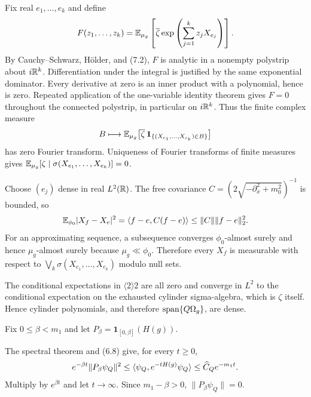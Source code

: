 \documentclass[11pt,a4paper]{article}
\begin{document}

\Because Fix real $e_1,\dots,e_k$ and define
\[
 F(z_1,\dots,z_k)=
 \mathbb E_{\mu_g}\left[\overline\zeta\exp\left(\sum_{j=1}^kz_jX_{e_j}\right)\right].
\]
By Cauchy--Schwarz, H\"older, and (7.2), $F$ is analytic in a nonempty
polystrip about $i\mathbb R^k$.  Differentiation under the integral is justified by the
same exponential dominator.  Every derivative at zero is an inner product with a
polynomial, hence is zero.  Repeated application of the one-variable identity theorem
gives $F=0$ throughout the connected polystrip, in particular on $i\mathbb R^k$.
Thus the finite complex measure
\[
 B\longmapsto\mathbb E_{\mu_g}\big[\overline\zeta\,
 \mathbf1_{\{(X_{e_1},\ldots,X_{e_k})\in B\}}\big]
\]
has zero Fourier transform.  Uniqueness of Fourier transforms of finite measures gives
$\mathbb E_{\mu_g}[\zeta\mid\sigma(X_{e_1},\dots,X_{e_k})]=0$.


\Because Choose $(e_j)$ dense in real $L^2(\mathbb R)$.  The free covariance
$C=(2\sqrt{-\partial_x^2+m_0^2})^{-1}$ is bounded, so
\[
 \mathbb E_{\phi_0}|X_f-X_e|^2=\langle f-e,C(f-e)\rangle\leq\|C\|\|f-e\|_2^2.
\]
For an approximating sequence, a subsequence converges $\phi_0$-almost surely and
hence $\mu_g$-almost surely because $\mu_g\ll\phi_0$.  Therefore every $X_f$ is
measurable with respect to $\bigvee_k\sigma(X_{e_1},\dots,X_{e_k})$ modulo null sets.


\Because The conditional expectations in $\langle2\rangle2$ are all zero and converge
in $L^2$ to the conditional expectation on the exhausted cylinder sigma-algebra, which
is $\zeta$ itself.  Hence cylinder polynomials, and therefore
$\operatorname{span}\{Q\Omega_g\}$, are dense.

\QedStep


Fix $0\leq\beta<m_1$ and let $P_\beta=\mathbf1_{[0,\beta]}(H(g))$.


\Because The spectral theorem and (6.8) give, for every $t\geq0$,
\[
 e^{-\beta t}\|P_\beta\psi_Q\|^2
 \leq\langle \psi_Q,e^{-tH(g)}\psi_Q\rangle
 \leq\widehat C_Qe^{-m_1t}.
\]
Multiply by $e^{\beta t}$ and let $t\to\infty$.  Since $m_1-\beta>0$,
$\|P_\beta\psi_Q\|=0$.
\end{document}
